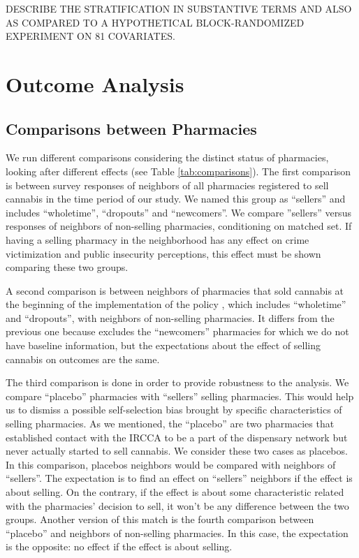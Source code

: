 \documentclass[11pt]{article}
\begin{document}
DESCRIBE THE STRATIFICATION IN SUBSTANTIVE TERMS AND ALSO AS COMPARED TO A HYPOTHETICAL BLOCK-RANDOMIZED EXPERIMENT ON 81 COVARIATES.

\section{Outcome Analysis}
\subsection{Comparisons between Pharmacies}
We run different comparisons considering the distinct status of pharmacies, looking after different effects (see Table \ref{tab:comparisons}). The first comparison is between survey responses of neighbors of all pharmacies registered to sell cannabis in the time period of our study. We named this group as ``sellers'' and includes ``wholetime'', ``dropouts'' and ``newcomers''. We compare ''sellers'' versus responses of neighbors of non-selling pharmacies, conditioning on matched set. If having a selling pharmacy in the neighborhood has any effect on crime victimization and public insecurity perceptions, this effect must be shown comparing these two groups.

A second comparison is between neighbors of pharmacies that sold cannabis at the beginning of the implementation of the policy , which includes ``wholetime'' and ``dropouts'', with neighbors of non-selling pharmacies. It differs from the previous one because excludes the ``newcomers'' pharmacies for which we do not have baseline information, but the expectations about the effect of selling cannabis on outcomes are the same.

The third comparison is done in order to provide robustness to the analysis. We compare ``placebo'' pharmacies with ``sellers'' selling pharmacies. This would help us to dismiss a possible self-selection bias brought by specific characteristics of selling pharmacies. As we mentioned, the ``placebo'' are two pharmacies that established contact with the IRCCA to be a part of the dispensary network but never actually started to sell cannabis. We consider these two cases as placebos. In this comparison, placebos neighbors would be compared with neighbors of ``sellers''. The expectation is to find an effect on ``sellers'' neighbors if the effect is about selling. On the contrary, if the effect is about some characteristic related with the pharmacies' decision to sell, it won't be any difference between the two groups. Another version of this match is the fourth comparison between ``placebo'' and neighbors of non-selling pharmacies. In this case, the expectation is the opposite: no effect if the effect is about selling.
\end{document}
